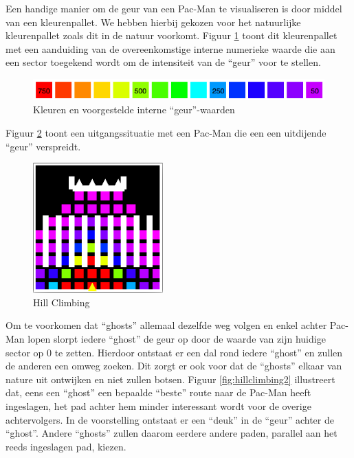 \documentclass[12pt,a4paper]{report}
\begin{document}
Een handige manier om de geur van een Pac-Man te visualiseren is door middel van een kleurenpallet. We hebben hierbij gekozen voor het natuurlijke kleurenpallet zoals dit in de natuur voorkomt. Figuur \ref{fig:colormap} toont dit kleurenpallet met een aanduiding van de overeenkomstige interne numerieke waarde die aan een sector toegekend wordt om de intensiteit van de ``geur'' voor te stellen.

\begin{figure}[htbp]
  \centering
  \includegraphics[width=150mm]{resources/colormap.png}
  \caption{Kleuren en voorgestelde interne ``geur''-waarden}
  \label{fig:colormap}
\end{figure}

Figuur \ref{fig:hillclimbing1} toont een uitgangssituatie met een Pac-Man die een een uitdijende ``geur'' verspreidt.

\begin{figure}[htbp]
  \centering
  \includegraphics[width=50mm]{resources/hillclimbing1.png}
  \caption{Hill Climbing}
  \label{fig:hillclimbing1}
\end{figure}

Om te voorkomen dat ``ghosts'' allemaal dezelfde weg volgen en enkel achter Pac-Man lopen slorpt iedere ``ghost'' de geur op door de waarde van zijn huidige sector op 0 te zetten. Hierdoor ontstaat er een dal rond iedere ``ghost'' en zullen de anderen een omweg zoeken. Dit zorgt er ook voor dat de ``ghosts'' elkaar van nature uit ontwijken en niet zullen botsen. Figuur \ref{fig:hillclimbing2} illustreert dat, eens een ``ghost'' een bepaalde ``beste'' route naar de Pac-Man heeft ingeslagen, het pad achter hem minder interessant wordt voor de overige achtervolgers. In de voorstelling ontstaat er een ``deuk'' in de ``geur'' achter de ``ghost''. Andere ``ghosts'' zullen daarom eerdere andere paden, parallel aan het reeds ingeslagen pad, kiezen.
\end{document}
